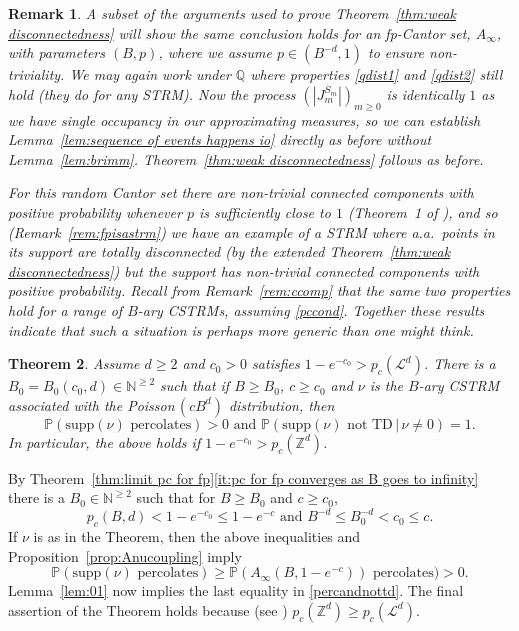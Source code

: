 \documentclass[12pt]{article}
\makeatletter
\renewenvironment{proof}[1][\proofname]{%
\par\pushQED{\qed}\normalfont%
\topsep6\p@\@plus6\p@\relax
\trivlist\item[\hskip\labelsep\bfseries#1\@addpunct{.}]%
\ignorespaces
}{%
\popQED\endtrivlist\@endpefalse
}
\newtheorem{theorem}{Theorem}
\numberwithin{theorem}{section}
\newtheorem{remark}[theorem]{Remark}
\theoremstyle{def}
\numberwithin{equation}{section}
\renewcommand{\P}{\mathbb{P}}
\newcommand{\Z}{\mathbb{Z}}
\newcommand{\Q}{\mathbb{Q}}
\newcommand{\N}{\mathbb{N}}
\newcommand{\cL}{\mathcal{L}}
\newcommand{\supp}{\mathrm{supp}}
\makeatother
\begin{document}
\begin{remark}\label{rem:weak disconnectedness result also holds for fp}
A subset of the arguments used to prove Theorem~\ref{thm:weak disconnectedness} will show the same conclusion holds for an fp-Cantor set, $A_\infty$, with parameters $(B,p)$, where we assume $p\in (B^{-d},1)$ to ensure non-triviality. We may again work under $\Q$ where properties \eqref{qdist1} and \eqref{qdist2} still hold (they do for any STRM).  Now the process $(|J_m^{S_m}|)_{m\geq 0}$ is identically $1$ as we have single occupancy in our approximating measures, so we can establish Lemma~\ref{lem:sequence of events happens io} directly as before without Lemma~\ref{lem:brimm}. Theorem~\ref{thm:weak disconnectedness} follows as before.

For  this random Cantor set there are non-trivial connected components  with positive probability whenever $p$ is sufficiently close to $1$ (Theorem~1 of \cite{CCD88}), and so (Remark~\ref{rem:fpisastrm}) we have an example of a STRM where a.a.\ points in its  support are totally disconnected (by the extended Theorem~\ref{thm:weak disconnectedness}) but the support has non-trivial connected components with positive probability. Recall from Remark~\ref{rem:ccomp} that the same two properties hold for a range of $B$-ary CSTRMs, {\it assuming \eqref{pccond}}.  Together these results indicate that such a situation is perhaps more generic than one might think.
\end{remark}
\begin{theorem} \label{thm:perc1} Assume $d\ge 2$ and $c_0>0$ satisfies $1-e^{-c_0}>p_c(\cL^d)$. There is a $B_0=B_0(c_0,d)\in \N^{\ge 2}$ such that if $B\ge B_0$, $c\ge c_0$ and $\nu$ is the $B$-ary CSTRM associated with the Poisson$\,(cB^d)$ distribution, then
\begin{equation}\label{percandnottd}
\P(\supp(\nu) \text{ percolates})>0\text{ and }\P(\supp(\nu)\text{ not TD}\,|\, \nu\neq 0)=1.
\end{equation}
In particular, the above holds if $1-e^{-c_0}>p_c(\Z^d)$.
\end{theorem}
\begin{proof} By Theorem~\ref{thm:limit pc for fp}\ref{it:pc for fp converges as B goes to infinity} there is a $B_0\in \N^{\ge 2}$ such that for $B\ge B_0$ and $c\ge c_0$,
\begin{equation*}
p_c(B,d)<1-e^{-c_0}\le 1-e^{-c}\text{ and }B^{-d}\le B_0^{-d}<c_0\le c.
\end{equation*}
If $\nu$ is as in the Theorem, then the above inequalities and Proposition~\ref{prop:Anucoupling} imply
\[\P(\supp(\nu)\text{ percolates})\ge \P(A_\infty(B,1-e^{-c}))\text{ percolates})>0.\]
Lemma~\ref{lem:01} now implies the last equality in \eqref{percandnottd}. The final assertion of the Theorem holds because (see \cite{FG92}) $p_c(\Z^d)\ge p_c(\cL^d)$.
\end{proof}
\end{document}
